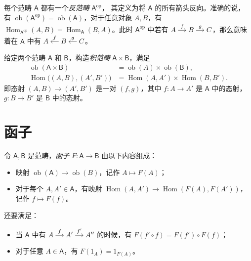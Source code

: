 \documentclass[fontset=none]{Notes}
\newenvironment{arr}[1][]{%
  $\begin{tikzcd}[cramped,#1]
}{\end{tikzcd}$}
\DeclareMathOperator\Hom{Hom}
\DeclareMathOperator\ob{ob}
\newcommand{\cat}[1]{\mathsf{#1}}
\newcommand{\opcat}[1]{\mathsf{#1}^{\mathrm{op}}}
\begin{document}
\begin{example}[反范畴]
  每个范畴 $\cat A$ 都有一个\emph{反范畴} $\opcat A$，
  其定义为将 $\cat A$ 的所有箭头反向。准确的说，
  有 $\ob(\opcat A)=\ob(\cat A)$，对于任意对象 $A,B$，有
  $\Hom_{\opcat A}(A,B)=\Hom_{\cat A}(B,A)$。此时
  $\opcat A$ 中若有
  \begin{arr}[sep=small]
    A\arrow[r,"f"] & B\arrow[r,"g"] & C
  \end{arr}，那么意味着在 $\cat A$ 中有
  \begin{arr}[sep=small]
    A & B\arrow[l,"f"'] & C\arrow[l,"g"']
  \end{arr}。
\end{example}

\begin{example}[积范畴]
  给定两个范畴 $\cat A$ 和 $\cat B$，构造\emph{积范畴}
  $\cat A\times\cat B$，满足
  \begin{align*}
    \ob(\cat A\times\cat B)&=\ob(A)\times\ob(\cat B),\\
    \Hom\bigl((A,B),(A',B')\bigr)&=\Hom(A,A')\times\Hom(B,B').
  \end{align*}
  即态射 $(A,B)\to(A',B')$ 是一对 $(f,g)$，其中 $f:A\to A'$
  是 $\cat A$ 中的态射，$g:B\to B'$ 是 $\cat B$ 中的态射。
\end{example}

\section{函子}

\begin{definition}
  令 $\cat A,\cat B$ 是范畴，\emph{函子} $F:\cat A\to \cat B$
  由以下内容组成：
  \begin{itemize}[nosep]
    \item 映射 $\ob(\cat A)\to \ob(B)$，记作 $A\mapsto F(A)$；
    \item 对于每个 $A,A'\in\cat A$，有映射 
    $\Hom(A,A')\to\Hom(F(A),F(A'))$，记作 $f\mapsto F(f)$。
  \end{itemize}
  还要满足：
  \begin{itemize}[nosep]
    \item 当 $\cat A$ 中有
    \begin{arr}[sep=small]
      A\arrow[r,"f"] & A'\arrow[r,"f'"] & A''
    \end{arr}
    的时候，有 $F(f'\circ f)=F(f')\circ F(f)$；
    \item 对于任意 $A\in\cat A$，有 $F(1_A)=1_{F(A)}$。
  \end{itemize}
\end{definition}
\end{document}
